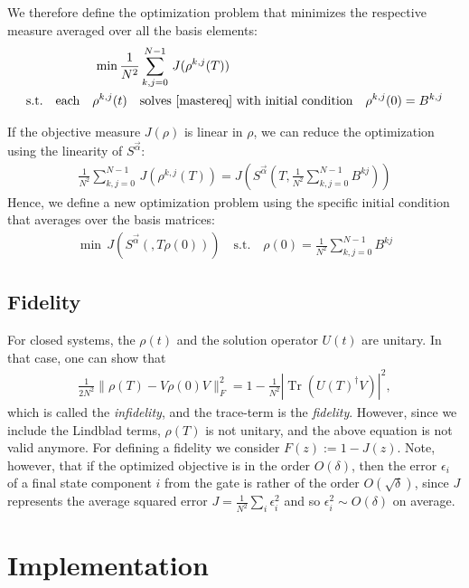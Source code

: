 \documentclass[letterpaper]{article}
\DeclareMathOperator{\Tr}{Tr}
\begin{document}
We therefore define the optimization problem that minimizes the respective measure averaged over all the basis elements:
\begin{align}\label{optimproblem_basis}
  \min \frac{1}{N^2} & \sum_{k,j=0}^{N-1} \, J(\rho^{k,j}(T))  \\
  \text{s.t.} \quad  \text{each} \quad \rho^{k,j}(t) \quad & \text{solves \eqref{mastereq} with initial condition} \quad \rho^{k,j}(0) = B^{k,j}
\end{align}

If the objective measure $J(\rho)$ is linear in $\rho$, we can reduce the optimization using the linearity of $S^{\vec{\alpha}}$:
\begin{align}
   \frac{1}{N^2}  \sum_{k,j=0}^{N-1} \, J\left(\rho^{k,j}(T)\right) = J\left(S^{\vec{\alpha}}\left(T,\frac{1}{N^2}  \sum_{k,j=0}^{N-1} B^{kj}\right)\right)
\end{align}
Hence, we define a new optimization problem using the specific initial condition that averages over the basis matrices:
\begin{align}
  \min \, J(S^{\vec{\alpha}}(,T\rho(0))) \quad \text{s.t.} \quad \rho(0) = \frac{1}{N^2}  \sum_{k,j=0}^{N-1} B^{kj}
\end{align}

\subsection{Fidelity} 
For closed systems, the $\rho(t)$ and the solution operator $U(t)$ are unitary. In that case, one can show that 
\begin{align}
  \frac{1}{2N^2}\|\rho(T) - V\rho(0)V\|_F^2 = 1 - \frac{1}{N^2}|\Tr(U(T)^{\dagger}V)|^2,
\end{align}
which is called the \textit{infidelity}, and the trace-term is the \textit{fidelity}. However, since we include the Lindblad terms, $\rho(T)$ is not unitary, and the above equation is not valid anymore. For defining a fidelity we consider $F(z) := 1 - J(z)$. Note, however, that if the optimized objective is in the order $O(\delta)$, then the error $\epsilon_i$ of a final state component $i$ from the gate is rather of the order $O(\sqrt{\delta})$, since $J$ represents the average squared error $J = \frac{1}{N^2}\sum_i \epsilon_i^2$ and so $\epsilon_i^2 \sim O(\delta)$ on average.

\section{Implementation}
\end{document}
